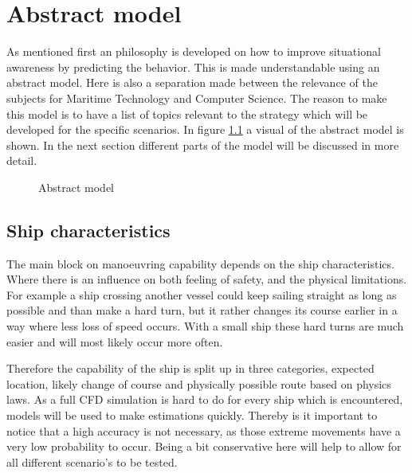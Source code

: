 \chapter{Abstract model}
As mentioned first an philosophy is developed on how to improve situational awareness by predicting the behavior. This is made understandable using an abstract model. Here is also a separation made between the relevance of the subjects for Maritime Technology and Computer Science. 
The reason to make this model is to have a list of topics relevant to the strategy which will be developed for the specific scenarios.
In figure \ref{fig:abstract-model} a visual of the abstract model is shown. In the next section different parts of the model will be discussed in more detail.

\begin{figure}[hb]
	\centering
	\caption{Abstract model}
	\label{fig:abstract-model}
\end{figure}


\section{Ship characteristics}
The main block on manoeuvring capability depends on the ship characteristics. Where there is an influence on both feeling of safety, and the physical limitations. For example a ship crossing another vessel could keep sailing straight as long as possible and than make a hard turn, but it rather changes its course earlier in a way where less loss of speed occurs. With a small ship these hard turns are much easier and will most likely occur more often.

Therefore the capability of the ship is split up in three categories, expected location, likely change of course and physically possible route based on physics laws.
As a full CFD simulation is hard to do for every ship which is encountered, models will be used to make estimations quickly. Thereby is it important to notice that a high accuracy is not necessary, as those extreme movements have a very low probability to occur. Being a bit conservative here will help to allow for all different scenario's to be tested.

